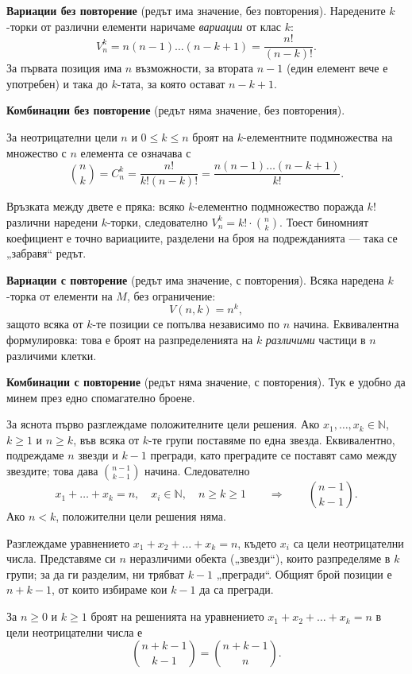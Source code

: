 \textbf{Вариации без повторение} (редът има значение, без повторения). Наредените
$k$-торки от различни елементи наричаме \emph{вариации} от клас $k$:
\[ V_n^k = n(n-1)\dots(n-k+1) = \frac{n!}{(n-k)!} . \]
За първата позиция има $n$ възможности, за втората $n-1$ (един елемент вече е употребен)
и така до $k$-тата, за която остават $n-k+1$.

\textbf{Комбинации без повторение} (редът няма значение, без повторения).

\begin{defn}\label{def:binom}
За неотрицателни цели $n$ и $0\le k\le n$ броят на $k$-елементните подмножества на множество с $n$ елемента се означава с
\[ \binom{n}{k} = C_n^k = \frac{n!}{k!(n-k)!} = \frac{n(n-1)\dots(n-k+1)}{k!} . \]
\end{defn}

Връзката между двете е пряка: всяко $k$-елементно подмножество поражда $k!$ различни
наредени $k$-торки, следователно $V_n^k = k! \cdot \binom{n}{k}$. Тоест биномният
коефициент е точно вариациите, разделени на броя на подрежданията — така се „забравя“
редът.

\textbf{Вариации с повторение} (редът има значение, с повторения). Всяка наредена
$k$-торка от елементи на $M$, без ограничение:
\[ V(n,k) = n^k , \]
защото всяка от $k$-те позиции се попълва независимо по $n$ начина. Еквивалентна
формулировка: това е броят на разпределенията на $k$ \emph{различими} частици в $n$
различими клетки.

\textbf{Комбинации с повторение} (редът няма значение, с повторения). Тук е удобно да
минем през едно спомагателно броене.

За яснота първо разглеждаме положителните цели решения. Ако $x_1,\dots,x_k\in\mathbb{N}$, $k\ge1$ и $n\ge k$, във всяка от $k$-те групи поставяме по една звезда. Еквивалентно, подреждаме $n$ звезди и $k-1$ прегради, като преградите се поставят само между звездите; това дава $\binom{n-1}{k-1}$ начина. Следователно
\[
x_1+\dots+x_k=n,\quad x_i\in\mathbb{N},\quad n\ge k\ge1
\qquad\Longrightarrow\qquad \binom{n-1}{k-1}.
\]
Ако $n<k$, положителни цели решения няма.

Разглеждаме уравнението $x_1 + x_2 + \dots + x_k = n$, където $x_i$ са цели
неотрицателни числа. Представяме си $n$ неразличими обекта („звезди“), които разпределяме
в $k$ групи; за да ги разделим, ни трябват $k-1$ „прегради“. Общият брой позиции е
$n + k - 1$, от които избираме кои $k-1$ да са прегради.

\begin{prop}\label{prop:stars-bars}
За $n\ge0$ и $k\ge1$ броят на решенията на уравнението $x_1 + x_2 + \dots + x_k = n$ в цели неотрицателни числа е
\[ \binom{n+k-1}{k-1} = \binom{n+k-1}{n} . \]
\end{prop}

